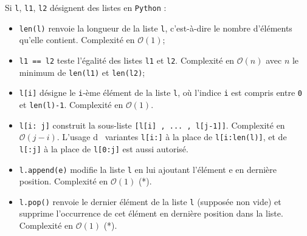 Si \lstinline{l}, \lstinline{l1}, \lstinline{l2} désignent des listes en \lstinline{Python} : 
\begin{itemize}
\item  \lstinline{len(l)} renvoie la longueur de la liste \lstinline{l}, c'est-à-dire le nombre d'éléments qu'elle contient.
Complexité en $\mathcal{O}(1)$;
\item  \lstinline{l1 == l2} teste l'égalité des listes \lstinline{l1} et \lstinline{l2}. Complexité en $\mathcal{O}(n)$ avec $n$ le minimum de \lstinline{len(l1)} et \lstinline{len(l2)};
\item  \lstinline{l[i]} désigne le \lstinline{i}-ème élément de la liste \lstinline{l}, où l'indice \lstinline{i} est compris entre \lstinline{0} et \lstinline{len(l)-1}. Complexité en $\mathcal{O}(1)$.
\item  \lstinline{l[i: j]} construit la sous-liste \lstinline{[l[i] , ... , l[j-1]]}. Complexité en $\mathcal{O}(j-i)$. L'usage d~
variantes \lstinline{l[i:]} à la place de \lstinline{l[i:len(l)]}, et de \lstinline{l[:j]} à la place de \lstinline{l[0:j]} est aussi
autorisé. 
\item \lstinline{l.append(e)} modifie la liste \lstinline{l} en lui ajoutant l'élément e en dernière position. Complexité
en $\mathcal{O}(1)$ (*).
\item \lstinline{l.pop()} renvoie le dernier élément de la liste \lstinline{l} (supposée non vide) et supprime l'occurrence
de cet élément en dernière position dans la liste. Complexité en $\mathcal{O}(1)$ (*).
\end{itemize} 